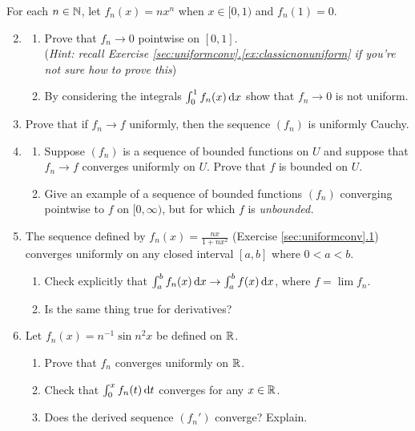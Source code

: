 \begin{exercises}
\exstart For each $n\in\mathbb{N}$, let $f_n(x)=nx^n$ when $x\in[0,1)$ and $f_n(1)=0$.
\begin{enumerate}\setcounter{enumi}{1}
	\item[]\begin{enumerate}
    \item Prove that $f_n\to 0$ pointwise on $[0,1]$.\\
    (\emph{Hint: recall Exercise \hyperref[ex:classicnonuniform]{\ref*{sec:uniformconv}.\ref*{ex:classicnonuniform}} if you're not sure how to prove this})
    \item By considering the integrals $\int_0^1f_n(x)\,{\mathrm{d} x}$ show that $f_n\to 0$ is not uniform.
  \end{enumerate}
  
  \item\label{ex:cauchyexproof} Prove that if $f_n\to f$ uniformly, then the sequence $(f_n)$ is uniformly Cauchy.
  
  \item\begin{enumerate}
    \item Suppose $(f_n)$ is a sequence of bounded functions on $U$ and suppose that $f_n\to f$ converges uniformly on $U$. Prove that $f$ is bounded on $U$.
    \item Give an example of a sequence of bounded functions $(f_n)$ converging pointwise to $f$ on $[0,\infty)$, but for which $f$ is \emph{unbounded.}
  \end{enumerate}
  
  \item The sequence defined by $f_n(x)=\frac{nx}{1+nx^2}$ (Exercise \hyperref[exs:uniform1]{\ref*{sec:uniformconv}.1}) converges uniformly on any closed interval $[a,b]$ where $0<a<b$.
  \begin{enumerate}
    \item Check explicitly that $\int_a^b f_n(x)\,{\mathrm{d} x}\to \int_a^bf(x)\,{\mathrm{d} x}$, where $f=\lim f_n$.
    \item Is the same thing true for derivatives?
  \end{enumerate}
  
 	\item Let $f_n(x)=n^{-1}\sin n^2x$ be defined on $\mathbb{R}$.
 	\begin{enumerate}
 	  \item Prove that $f_n$ converges uniformly on $\mathbb{R}$.
 	  \item Check that $\int_0^x f_n(t)\,{\mathrm{d} t}$ converges for any $x\in\mathbb{R}$.
 	  \item Does the derived sequence $(f_n')$ converge? Explain.
 	\end{enumerate}
  

\end{enumerate}
\end{exercises}
